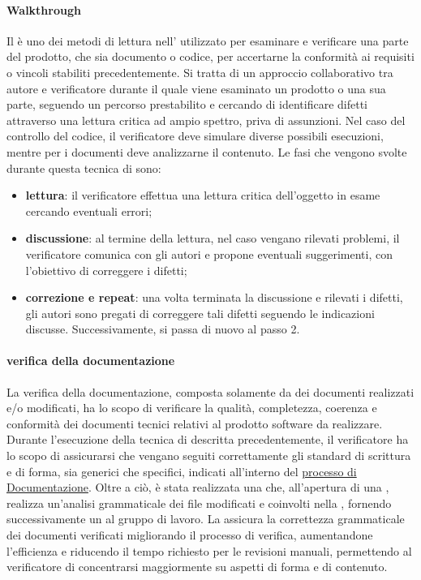 \paragraph{Walkthrough}
Il  è uno dei metodi di lettura nell' utilizzato per esaminare e verificare una parte del prodotto, che sia documento o codice, per accertarne la conformità ai requisiti o vincoli stabiliti precedentemente.
Si tratta di un approccio collaborativo tra autore e verificatore durante il quale viene esaminato un prodotto o una sua parte, seguendo un percorso prestabilito e cercando di identificare difetti attraverso una lettura critica ad ampio spettro, priva di assunzioni.
Nel caso del controllo del codice, il verificatore deve simulare diverse possibili esecuzioni, mentre per i documenti deve analizzarne il contenuto.
Le fasi che vengono svolte durante questa tecnica di  sono:
\begin{itemize}
    \item \textbf{lettura}: il verificatore effettua una lettura critica dell'oggetto in esame cercando eventuali errori;
    \item \textbf{discussione}: al termine della lettura, nel caso vengano rilevati problemi, il verificatore comunica con gli autori e propone eventuali suggerimenti, con l'obiettivo di correggere i difetti;
    \item \textbf{correzione e repeat}: una volta terminata la discussione e rilevati i difetti, gli autori sono pregati di correggere tali difetti seguendo le indicazioni discusse. Successivamente, si passa di nuovo al passo 2.
\end{itemize}
\paragraph{verifica della documentazione}
La verifica della documentazione, composta solamente da  dei documenti realizzati e/o modificati, ha lo scopo di verificare
la qualità, completezza, coerenza e conformità dei documenti tecnici relativi al prodotto software da realizzare.
Durante l'esecuzione della tecnica di  descritta precedentemente, il verificatore ha lo scopo di 
assicurarsi che vengano seguiti correttamente gli standard di scrittura e di forma, sia generici che specifici, indicati all'interno
del \hyperref[subsec:documentazione]{processo di Documentazione}.
Oltre a ciò, è stata realizzata una  che, all'apertura di una , realizza un'analisi grammaticale dei file 
modificati e coinvolti nella , fornendo successivamente un  al gruppo di lavoro.
La  assicura la correttezza grammaticale dei documenti verificati migliorando il processo di verifica, aumentandone l'efficienza 
e riducendo il tempo richiesto per le revisioni manuali, permettendo al verificatore di concentrarsi maggiormente su aspetti 
di forma e di contenuto.
